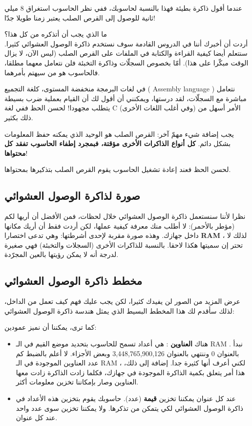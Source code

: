 \begin{information}
   عندما أقول ذاكرة بطيئة فهذا بالنسبة لحاسوبك، ففي نظر الحاسوب استغراق 8 ميلي ثانية للوصول إلى القرص الصلب يعتبر زمنا طويلا جدّا!
\end{information}

ما الذي يجب أن أتذكره من كل هذا؟\\
أردت أن أخبرك أننا في الدروس القادمة سوف نستخدم ذاكرة الوصول العشوائي كثيرا. سنتعلم أيضا كيفية القراءة والكتابة في الملفات على القرص الصلب (ليس الآن، لا يزال الوقت مبكّرا على هذا). أمّا بخصوص السجلّات وذاكرة التخبئة فلن نتعامل معهما مطلقا، فالحاسوب هو من سيهتم بأمرهما.

\begin{information}
  في لغات البرمجة منخفضة المستوى، كلغة التجميع (
\textenglish{Assembly language}
) نتعامل مباشرة مع السجلّات، لقد درستها، ويمكنني أن أقول لك أن القيام بعملية ضرب بسيطة يتطلب مجهودا! لحسن الحظ ففي لغة
\textenglish{C}
 (وفي أغلب اللغات الأخرى) الأمر أسهل من ذلك بكثير.
\end{information}

يجب إضافة شيء مهمّ آخر: القرص الصلب هو الوحيد الذي يمكنه حفظ المعلومات بشكل دائم.
\textbf{كل أنواع الذاكرات الأخرى مؤقتة، فبمجرد إطفاء الحاسوب تفقد كل محتواها}!

لحسن الحظ فعند إعادة تشغيل الحاسوب يقوم القرص الصلب بتذكيرها بمحتواها.

\subsection{صورة لذاكرة الوصول العشوائي}
نظرا لأننا سنستعمل ذاكرة الوصول العشوائي خلال لحظات، فمن الأفضل أن أريها لكم (مؤطر بالأحمر):
لا أطلب منك معرفة كيفية عملها، لكن أردت فقط أن أريك مكانها داخل جهازك. وهذه صورة مقربة لإحدى أشرطتها:
وهي تدعى اختصارا
\textbf{\textenglish{RAM}}
، لذلك لا تحتر إن سميتها هكذا لاحقا. بالنسبة للذاكرات الأخرى (السجلات والتخبئة) فهي صغيرة لدرجة أنه لا يمكن رؤيتها بالعين المجرّدة.

\subsection{مخطط ذاكرة الوصول العشوائي}
عرض المزيد من الصور لن يفيدك كثيرا، لكن يجب عليك فهم كيف تعمل من الداخل، لذلك سأقدم لك هذا المخطط البسيط الذي يمثل هندسة ذاكرة الوصول العشوائي:

كما ترى، يمكننا أن نميز عمودين:
\begin{itemize}
  \item هناك
\textbf{العناوين}
: هي أعداد تسمح للحاسوب بتحديد موضع القيم في الـ
\textenglish{RAM}
. نبدأ بالعنوان 0 وننتهي بالعنوان 3,448,765,900,126 وبعض الأجزاء. لا أعلم بالضبط كم عدد العناوين الموجودة في الـ
\textenglish{RAM}
، لكني أعرف أنها كثيرة جدا. إضافة إلى ذلك، هذا أمر يتعلق بكمية الذاكرة الموجودة في جهازك، فكلما زادت الذاكرة زادت معها العناوين وصار بإمكاننا تخزين معلومات أكثر.
  \item عند كل عنوان يمكننا تخزين
\textbf{قيمة}
(عدد). حاسوبك يقوم بتخزين هذه الأعداد في ذاكرة الوصول العشوائي لكي يتمكن من تذكرها. ولا يمكننا تخزين سوى عدد واحد عند كل عنوان.
\end{itemize}

